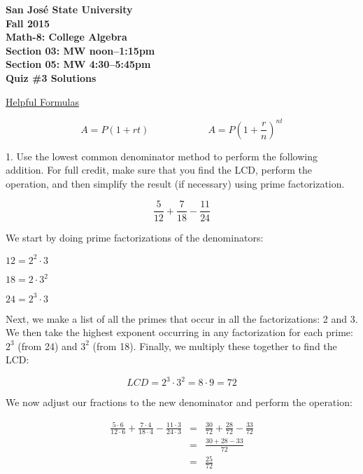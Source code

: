 \documentclass[letterpaper, 12pt]{article}
\begin{document}
\begin{center}
\bfseries
San Jos\'{e} State University \\
Fall 2015 \\
Math-8: College Algebra \\
Section 03: MW noon--1:15pm \\
Section 05: MW 4:30--5:45pm \\
\bigskip
Quiz \#3 Solutions
\end{center}

\bigskip

\newcommand{\answer}[1]{\textbf{\underline{#1}}}

\underline{Helpful Formulas}

\[A=P\left(1+rt\right)\hspace{1in}A=P\left(1+\frac{r}{n}\right)^{nt}\]

\bigskip

1. Use the lowest common denominator method to perform the following addition.
For full credit, make sure that you find the LCD, perform the operation, and
then simplify the result (if necessary) using prime factorization.

\[\frac{5}{12}+\frac{7}{18}-\frac{11}{24}\]

\bigskip

We start by doing prime factorizations of the denominators:

\bigskip

$12=2^2\cdot3$

$18=2\cdot3^2$

$24=2^3\cdot3$

\bigskip

Next, we make a list of all the primes that occur in all the factorizations:
2 and 3.  We then take the highest exponent occurring in any factorization for
each prime: $2^3$ (from 24) and $3^2$ (from 18).  Finally, we multiply these
together to find the LCD:

\[LCD=2^3\cdot3^2=8\cdot9=72\]

We now adjust our fractions to the new denominator and perform the operation:

\begin{eqnarray*}
\frac{5\cdot6}{12\cdot6}+\frac{7\cdot4}{18\cdot4}-\frac{11\cdot3}{24\cdot3} &=&
\frac{30}{72}+\frac{28}{72}-\frac{33}{72} \\
&=& \frac{30+28-33}{72} \\
&=& \frac{25}{72} \\
\end{eqnarray*}
\end{document}
